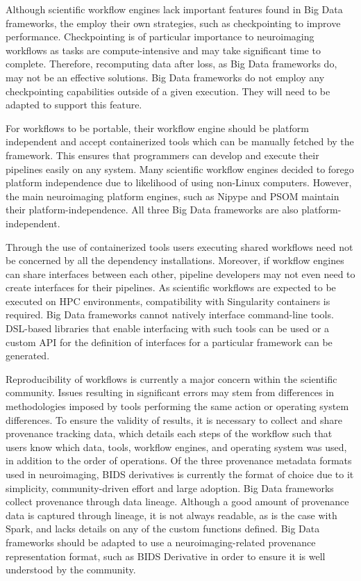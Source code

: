 \documentclass{report}
\begin{document}
        Although scientific workflow engines lack important features found in 
        Big Data frameworks, the employ their own strategies, such as 
        checkpointing to improve performance. Checkpointing is of particular 
        importance to neuroimaging workflows as tasks are compute-intensive and
        may take significant time to complete. Therefore, recomputing data after
        loss, as Big Data frameworks do, may not be an effective solutions. Big
        Data frameworks do not employ any checkpointing capabilities outside of
        a given execution. They will need to be adapted to support this feature.


        For workflows to be portable, their workflow engine should be platform
        independent and accept containerized tools which can be manually 
        fetched by the framework. This ensures that programmers can develop
        and execute their pipelines easily on any system. Many scientific 
        workflow engines decided to forego platform independence due to 
        likelihood of using non-Linux computers. However, the main neuroimaging
        platform engines, such as Nipype and PSOM maintain their 
        platform-independence. All three Big Data frameworks are also
        platform-independent.


        Through the use of containerized tools users executing shared workflows
        need not be concerned by all the dependency installations. Moreover, 
        if workflow engines can share interfaces between each other, pipeline
        developers may not even need to create interfaces for their pipelines.
        As scientific workflows are expected to be executed on HPC environments,
        compatibility with Singularity containers is required. Big Data frameworks
        cannot natively interface command-line tools. DSL-based libraries that
        enable interfacing with such tools can be used or a custom API for
        the definition of interfaces for a particular framework can be generated.


        Reproducibility of workflows is currently a major concern within the 
        scientific community. Issues resulting in significant errors may stem
        from differences in methodologies imposed by tools performing the same
        action or operating system differences. To ensure the validity of 
        results, it is necessary to collect and share provenance tracking data,
        which details each steps of the workflow such that users know which data,
        tools, workflow engines, and operating system was used, in addition to
        the order of operations. Of the three provenance metadata formats used 
        in neuroimaging, BIDS derivatives is currently the format of choice due
        to it simplicity, community-driven effort and large adoption. Big Data
        frameworks collect provenance through data lineage. Although a good 
        amount of provenance data is captured through lineage, it is not always
        readable, as is the case with Spark, and lacks details on any of the
        custom functions defined. Big Data frameworks should be adapted to use
        a neuroimaging-related provenance representation format, such as BIDS 
        Derivative in order to ensure it is well understood by the community.
\end{document}
